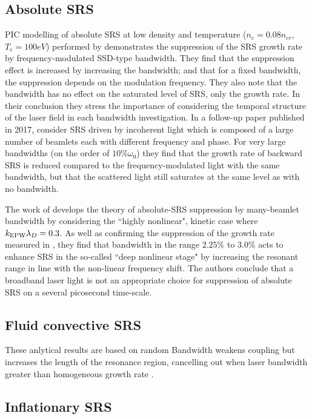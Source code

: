 \subsection{Absolute SRS}
PIC modelling of absolute SRS at low density and temperature ($n_e=0.08n_{cr}$, $T_e=100\si{eV}$)
 performed by \citet{Zhao2015} demonstrates the suppression of the SRS growth rate by frequency-modulated SSD-type bandwidth. They find that the suppression effect is increased by increasing the bandwidth; and that for a fixed bandwidth, the suppression depends on the modulation frequency. They also note that the bandwidth has no effect on the saturated level of SRS, only the growth rate. In their conclusion they stress the importance of considering the temporal structure of the laser field in each bandwidth investigation. In a follow-up paper published in 2017, \citet{Zhao2017a} consider SRS driven by incoherent light which is composed of a large number of beamlets each with different frequency and phase. For very large bandwidths (on the order of $10\%\omega_0$) they find that the growth rate of backward SRS is reduced compared to the frequency-modulated light with the same bandwidth, but that the scattered light still saturates at the same level as with no bandwidth.

The work of \citet{Zhou2018} develops the theory of absolute-SRS suppression by many-beamlet bandwidth by considering the ``highly nonlinear", kinetic case where $k_\mathrm{EPW}\lambda_D=0.3$. As well as confirming the suppression of the growth rate measured in \citep{Zhao2015,Zhao2017a}, they find that bandwidth in the range $2.25\%$ to $3.0\%$ acts to enhance SRS in the so-called ``deep nonlinear stage" by increasing the resonant range in line with the non-linear frequency shift. The authors conclude that a broadband laser light is not an appropriate choice for suppression of absolute SRS on a several picosecond time-scale. 



\subsection{Fluid convective SRS}
These anlytical results are based on random
Bandwidth weakens coupling but increases the length of the resonance region, cancelling out when laser bandwidth greater than homogeneous growth rate \citep{Guzdar1991}.

\subsection{Inflationary SRS}

